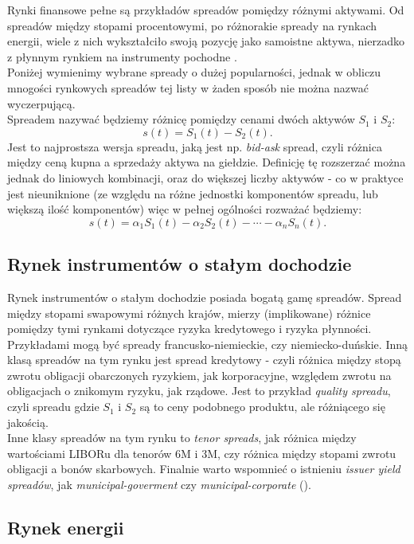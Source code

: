 Rynki finansowe pełne są przykładów spreadów pomiędzy różnymi aktywami. Od spreadów między stopami procentowymi, po różnorakie spready na rynkach energii, wiele z nich wykształciło swoją pozycję jako samoistne aktywa, nierzadko z płynnym rynkiem na instrumenty pochodne \cite{Carmona_Spread_Options}.\\
Poniżej wymienimy wybrane spready o dużej popularności, jednak w obliczu mnogości rynkowych spreadów tej listy w żaden sposób nie można nazwać wyczerpującą.\\

Spreadem nazywać będziemy różnicę pomiędzy cenami dwóch aktywów $S_1$ i $S_2$:
$$ s(t) = S_1(t) - S_2(t).$$
Jest to najprostsza wersja spreadu, jaką jest np. \emph{bid-ask} spread, czyli różnica między ceną kupna a sprzedaży aktywa na giełdzie. Definicję tę rozszerzać można jednak do liniowych kombinacji, oraz do większej liczby aktywów - co w praktyce jest nieuniknione (ze względu na różne jednostki komponentów spreadu, lub większą ilość komponentów) więc w pełnej ogólności rozważać będziemy:
$$ s(t) = \alpha_1S_1(t) - \alpha_2S_2(t) - \cdots -\alpha_nS_n(t).$$

\subsection{Rynek instrumentów o stałym dochodzie}

Rynek instrumentów o stałym dochodzie posiada bogatą gamę spreadów. Spread między stopami swapowymi różnych krajów, mierzy (implikowane) różnice pomiędzy tymi rynkami dotyczące ryzyka kredytowego i ryzyka płynności. Przykładami mogą być spready francusko-niemieckie, czy niemiecko-duńskie. Inną klasą spreadów na tym rynku jest spread kredytowy - czyli różnica między stopą zwrotu obligacji obarczonych ryzykiem, jak korporacyjne, względem zwrotu na obligacjach o znikomym ryzyku, jak rządowe. Jest to przykład \emph{quality spreadu}, czyli spreadu gdzie $S_1$ i $S_2$ są to ceny podobnego produktu, ale różniącego się jakością.\\
Inne klasy spreadów na tym rynku to \emph{tenor spreads}, jak różnica między wartościami LIBORu dla tenorów 6M i 3M, czy różnica między stopami zwrotu obligacji a bonów skarbowych. Finalnie warto wspomnieć o istnieniu \emph{issuer yield spreadów}, jak \emph{municipal-goverment} czy \emph{municipal-corporate} (\cite{Fixed_Income}).


\subsection{Rynek energii}

